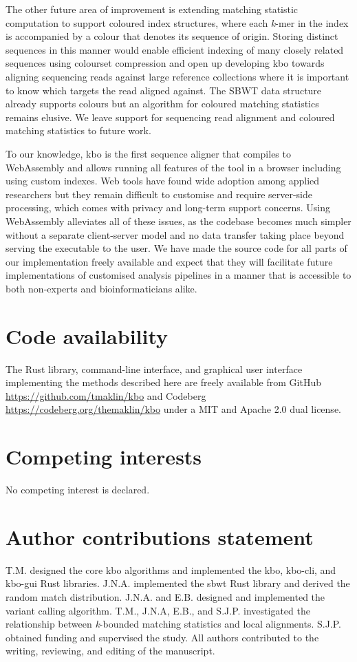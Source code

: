 \documentclass[unnumsec,webpdf,contemporary,large]{oup-authoring-template}%
\theoremstyle{thmstyleone}%
\theoremstyle{thmstyletwo}%
\theoremstyle{thmstylethree}%
\begin{document}
The other future area of improvement is extending matching statistic computation to support coloured index structures, where each \emph{k}-mer in the index is accompanied by a colour that denotes its sequence of origin. Storing distinct sequences in this manner would enable efficient indexing of many closely related sequences using colourset compression and open up developing {\sf kbo} towards aligning sequencing reads against large reference collections where it is important to know which targets the read aligned against. The SBWT data structure already supports colours but an algorithm for coloured matching statistics remains elusive. We leave support for sequencing read alignment and coloured matching statistics to future work.

To our knowledge, {\sf kbo} is the first sequence aligner that compiles to WebAssembly and allows running all features of the tool in a browser including using custom indexes. Web tools have found wide adoption among applied researchers but they remain difficult to customise and require server-side processing, which comes with privacy and long-term support concerns. Using WebAssembly alleviates all of these issues, as the codebase becomes much simpler without a separate client-server model and no data transfer taking place beyond serving the executable to the user. We have made the source code for all parts of our implementation freely available and expect that they will facilitate future implementations of customised analysis pipelines in a manner that is accessible to both non-experts and bioinformaticians alike.


\section{Code availability}
The Rust library, command-line interface, and graphical user interface implementing the methods described here are freely available from GitHub \url{https://github.com/tmaklin/kbo} and Codeberg \url{https://codeberg.org/themaklin/kbo} under a MIT and Apache 2.0 dual license.

\section{Competing interests}
No competing interest is declared.

\section{Author contributions statement}
T.M. designed the core kbo algorithms and implemented the kbo, kbo-cli, and kbo-gui Rust libraries. J.N.A. implemented the sbwt Rust library and derived the random match distribution. J.N.A. and E.B. designed and implemented the variant calling algorithm. T.M., J.N.A, E.B., and S.J.P. investigated the relationship between \emph{k}-bounded matching statistics and local alignments. S.J.P. obtained funding and supervised the study. All authors contributed to the writing, reviewing, and editing of the manuscript.
\end{document}
